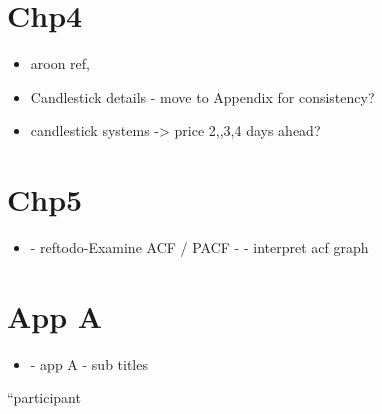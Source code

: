 \section{Chp4}
\begin{itemize}
\item aroon ref, 
\item Candlestick details - move to Appendix for consistency?
\item candlestick systems -> price 2,,3,4 days ahead?
\end{itemize}

\section{Chp5}
\begin{itemize}
\item - ref{todo-Examine ACF / PACF} - - interpret acf graph
\end{itemize}

\section{App A}
\begin{itemize}
\item - app A - sub titles
\end{itemize}


\textquotedblleft participant